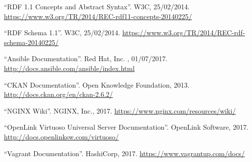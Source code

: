  ``RDF 1.1 Concepts and Abstract Syntax''. W3C, 25/02/2014. \url{https://www.w3.org/TR/2014/REC-rdf11-concepts-20140225/}

 ``RDF Schema 1.1''. W3C, 25/02/2014. \url{https://www.w3.org/TR/2014/REC-rdf-schema-20140225/}

 ``Ansible Documentation''. Red Hat, Inc. , 01/07/2017. \url{http://docs.ansible.com/ansible/index.html}

 ``CKAN Documentation''. Open Knowledge Foundation, 2013. \url{http://docs.ckan.org/en/ckan-2.6.2/}

 ``NGINX Wiki''. NGINX, Inc., 2017. \url{https://www.nginx.com/resources/wiki/}

 ``OpenLink Virtuoso Universal Server Documentation''. OpenLink Software, 2017. \url{http://docs.openlinksw.com/virtuoso/}

 ``Vagrant Documentation''. HashiCorp, 2017. \url{https://www.vagrantup.com/docs/}